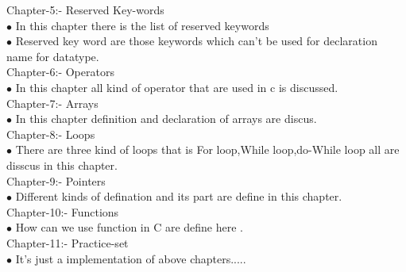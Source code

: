 \documentclass{article}
\begin{document}
{\pagebreak}

{\color{red}Chapter-5:- Reserved Key-words}\\
$\bullet$ In this chapter there is the list of reserved keywords \\
$\bullet$ Reserved key word are those keywords which can't be used for declaration name for datatype. \\
{\color{red}Chapter-6:- Operators}\\
$\bullet$ In this chapter all kind of operator that are used in c is discussed.\\
{\color{red}Chapter-7:- Arrays}\\
$\bullet$ In this chapter definition and declaration of arrays are discus.\\
{\color{red}Chapter-8:- Loops}\\
$\bullet$ There are three kind of loops that is For loop,While loop,do-While loop all are disscus in this chapter.\\
{\color{red}Chapter-9:- Pointers}\\
$\bullet$ Different kinds of defination and its part are define in this chapter.\\
{\color{red}Chapter-10:- Functions}\\
$\bullet$ How can we use function in C are define here .\\
{\color{red}Chapter-11:- Practice-set}\\
$\bullet$ It's just a implementation of above chapters.....\\
\end{document}
